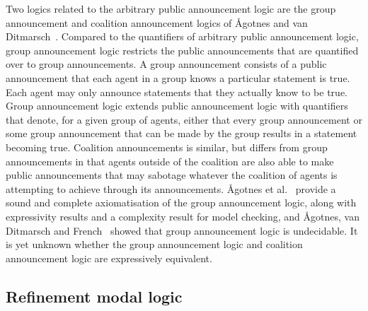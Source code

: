 Two logics related to the arbitrary public announcement logic are the group announcement and coalition announcement logics of {\AA}gotnes and van Ditmarsch~\cite{agotnes:2008,agotnes:2010}. 
Compared to the quantifiers of arbitrary public announcement logic, group announcement logic restricts the public announcements that are quantified over to group announcements.
A group announcement consists of a public announcement that each agent in a group knows a particular statement is true.
Each agent may only announce statements that they actually know to be true.
Group announcement logic extends public announcement logic with quantifiers that denote, for a given group of agents, either that every group announcement or some group announcement that can be made by the group results in a statement becoming true.
Coalition announcements is similar, but differs from group announcements in that agents outside of the coalition are also able to make public announcements that may sabotage whatever the coalition of agents is attempting to achieve through its announcements.
{\AA}gotnes et al.~\cite{agotnes:2010} provide a sound and complete axiomatisation of the group announcement logic, along with expressivity results and a complexity result for model checking, and {\AA}gotnes, van Ditmarsch and French~\cite{agotnes:2014} showed that group announcement logic is undecidable.
It is yet unknown whether the group announcement logic and coalition announcement logic are expressively equivalent.


\subsection{Refinement modal logic}

